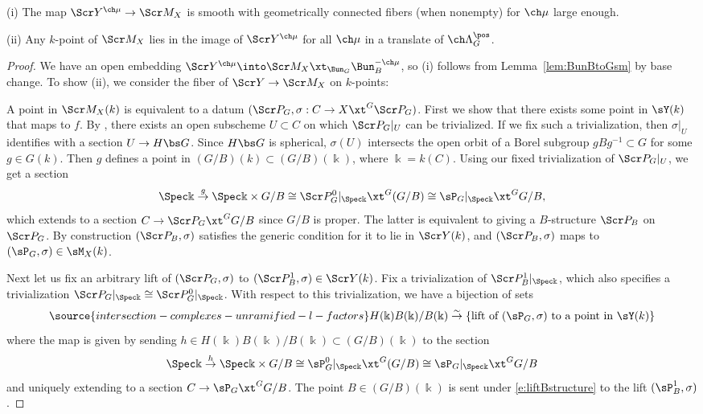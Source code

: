 \begin{cor}
\notready\label{cor:Mcover}
(i) The map $\Scr Y^{\ch\mu} \to \Scr M_{X}$
is smooth with geometrically connected fibers (when nonempty) for $\ch\mu$ large enough.

(ii)
Any $k$-point of $\Scr M_{X}$ lies in the image of $\Scr Y^{\ch\mu}$ for all $\ch\mu$ in a translate of $\ch\Lambda^\pos_G$.
\end{cor}
\begin{proof}
We have an open embedding $\Scr Y^{\ch\mu} \into \Scr M_{X} \xt_{\Bun_G} \Bun_B^{-\ch\mu}$, so (i) follows from Lemma~\ref{lem:BunBtoGsm}
by base change. To show (ii), we consider the fiber of
$\Scr Y \to \Scr M_{X}$ on $k$-points:

A point in $\Scr M_X(k)$ is equivalent to a datum
$(\Scr P_G, \sigma : C\to X\xt^G \Scr P_G)$.
First we show that there exists some point in $\sY(k)$ that maps to $f$.
By \cite{Steinberg}, there exists an open subscheme $U\subset C$
on which $\Scr P_G|_U$ can be trivialized.
If we fix such a trivialization, then $\sigma|_U$
identifies with a section $U \to H\bs G$. Since $H\bs G$ is
spherical, $\sigma(U)$ intersects the open orbit of a
Borel subgroup $g B g^{-1} \subset G$ for some $g\in G(k)$.
Then $g$ defines a point in
$(G/B)(k) \subset (G/B)(\Bbbk)$, where $\Bbbk=k(C)$.
Using our fixed trivialization
of $\Scr P_G|_U$, we get a section
\[ \Spec \Bbbk \overset{g}\to \Spec \Bbbk \times G/B \cong \Scr P_G^0|_{\Spec \Bbbk} \xt^G (G/B)
\cong \sP_G|_{\Spec \Bbbk} \xt^G G/B,
\]
which extends to a section $C \to \Scr P_G \xt^G G/B$ since
$G/B$ is proper. The latter is equivalent to giving a
$B$-structure $\Scr P_B$ on $\Scr P_G$.
By construction $(\Scr P_B,\sigma)$ satisfies the generic condition
for it to lie in $\Scr Y(k)$, and $(\Scr P_B,\sigma)$ maps to $(\sP_G,\sigma) \in \sM_X(k)$.

Next let us fix an arbitrary lift of $(\Scr P_G,\sigma)$ to $(\Scr P_B^1,\sigma)\in \Scr Y(k)$.
Fix a trivialization of $\Scr P_B^1|_{\Spec \Bbbk}$, which also specifies a
trivialization $\Scr P_G|_{\Spec \Bbbk} \cong \Scr P_G^0|_{\Spec \Bbbk}$.
With respect to this trivialization, we have a bijection of sets
\begin{equation}\label{e:liftBstructure}
\source{intersection-complexes-unramified-l-factors}
    H(\Bbbk)B(\Bbbk)/B(\Bbbk) \overset\sim\to \{\text{lift of } (\sP_G,\sigma) \text{ to a point in } \sY(k) \}
\end{equation}
where the map is given by sending $h \in H(\Bbbk)B(\Bbbk)/B(\Bbbk)\subset (G/B)(\Bbbk)$ to
the section
\[ \Spec \Bbbk \overset{h}\to \Spec \Bbbk \times G/B \cong \sP^0_G|_{\Spec \Bbbk} \xt^G(G/B)
\cong \sP_G|_{\Spec \Bbbk} \xt^G G/B \]
and uniquely extending to a section $C \to \sP_G \xt^G G/B$.
The point $B \in (G/B)(\Bbbk)$ is sent under \eqref{e:liftBstructure} to the lift $(\sP_B^1,\sigma)$.


\end{proof}
